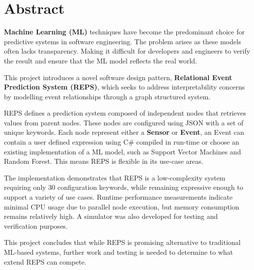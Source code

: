 \section{Abstract}
	\textbf{Machine Learning (ML)} techniques have become the predominant choice for predictive systems in software engineering. The problem arises as these models often lacks transparency. Making it difficult for developers and engineers to verify the result and ensure that the ML model reflects the real world.
	
	This project introduces a novel software design pattern, \textbf{Relational Event Prediction System (REPS)}, which seeks to address interpretability concerns by modelling event relationships through a graph structured system.
	
	REPS defines a prediction system composed of independent nodes that retrieves values from parent nodes. These nodes are configured using JSON with a set of unique keywords. Each node represent either a \textbf{Sensor} or \textbf{Event}, an Event can contain a user defined expression using C\# compiled in run-time or choose an existing implementation of a ML model, such as Support Vector Machines and Random Forest. This means REPS is flexible in its use-case areas.
	
	The implementation demonstrates that REPS is a low-complexity system requiring only 30 configuration keywords, while remaining expressive enough to support a variety of use cases. Runtime performance measurements indicate minimal CPU usage due to parallel node execution, but memory consumption remains relatively high. A simulator was also developed for testing and verification purposes.
	
	This project concludes that while REPS is promising alternative to traditional ML-based systems, further work and testing is needed to determine to what extend REPS can compete.

